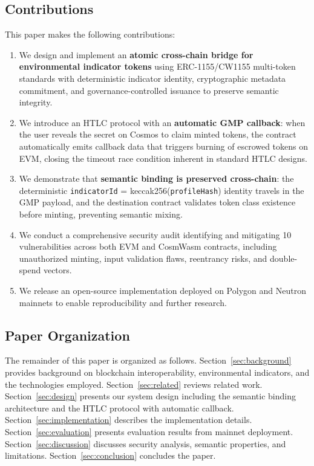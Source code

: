 \documentclass[conference,10pt]{IEEEtran}
\begin{document}
\subsection{Contributions}

This paper makes the following contributions:

\begin{enumerate}
    \item We design and implement an \textbf{atomic cross-chain bridge for environmental indicator tokens} using ERC-1155/CW1155 multi-token standards with deterministic indicator identity, cryptographic metadata commitment, and governance-controlled issuance to preserve semantic integrity.
    
    \item We introduce an HTLC protocol with an \textbf{automatic GMP callback}: when the user reveals the secret on Cosmos to claim minted tokens, the contract automatically emits callback data that triggers burning of escrowed tokens on EVM, closing the timeout race condition inherent in standard HTLC designs.
    
    \item We demonstrate that \textbf{semantic binding is preserved cross-chain}: the deterministic \texttt{indicatorId} = keccak256(\texttt{profileHash}) identity travels in the GMP payload, and the destination contract validates token class existence before minting, preventing semantic mixing.
    
    \item We conduct a comprehensive security audit identifying and mitigating 10 vulnerabilities across both EVM and CosmWasm contracts, including unauthorized minting, input validation flaws, reentrancy risks, and double-spend vectors.
    
    \item We release an open-source implementation deployed on Polygon and Neutron mainnets to enable reproducibility and further research.
\end{enumerate}

\subsection{Paper Organization}

The remainder of this paper is organized as follows. Section~\ref{sec:background} provides background on blockchain interoperability, environmental indicators, and the technologies employed. Section~\ref{sec:related} reviews related work. Section~\ref{sec:design} presents our system design including the semantic binding architecture and the HTLC protocol with automatic callback. Section~\ref{sec:implementation} describes the implementation details. Section~\ref{sec:evaluation} presents evaluation results from mainnet deployment. Section~\ref{sec:discussion} discusses security analysis, semantic properties, and limitations. Section~\ref{sec:conclusion} concludes the paper.
\end{document}
